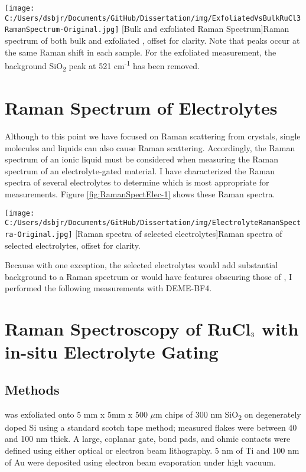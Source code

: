 \begin{centering}
\texttt{[image: C:/Users/dsbjr/Documents/GitHub/Dissertation/img/ExfoliatedVsBulkRuCl3RamanSpectrum-Original.jpg]}
  \captionsetup{width=0.75\textwidth}
  [Bulk and exfoliated \rucl Raman Spectrum]{Raman spectrum of both bulk and exfoliated \ruclnospace , offset for clarity. Note that peaks occur at the same Raman shift in each sample. For the exfoliated measurement, the background SiO\textsubscript{2} peak at 521 cm\textsuperscript{-1} has been removed.}
  \label{fig:RamanSpectRuCl3-4}
\end{centering}

\section{Raman Spectrum of Electrolytes}
Although to this point we have focused on Raman scattering from crystals, single molecules and liquids can also cause Raman scattering. Accordingly, the Raman spectrum of an ionic liquid must be considered when measuring the Raman spectrum of an electrolyte-gated material. I have characterized the Raman spectra of several electrolytes to determine which is most appropriate for measurements. Figure \ref{fig:RamanSpectElec-1} shows these Raman spectra.

\begin{centering}
\texttt{[image: C:/Users/dsbjr/Documents/GitHub/Dissertation/img/ElectrolyteRamanSpectra-Original.jpg]}
  \captionsetup{width=0.75\textwidth}
  [Raman spectra of selected electrolytes]{Raman spectra of selected electrolytes, offset for clarity.}
  \label{fig:RamanSpectElec-1}
\end{centering}

Because with one exception, the selected electrolytes would add substantial background to a Raman spectrum or would have features obscuring those of \rucl, I performed the following measurements with DEME-BF4.

\section{Raman Spectroscopy of \texorpdfstring{RuCl$\textsubscript{3}$}{RuCl3} with in-situ Electrolyte Gating}

\subsection{Methods}
\rucl was exfoliated onto 5 mm x 5mm x 500 $\mu$m chips of 300 nm SiO\textsubscript{2} on degenerately doped Si using a standard scotch tape method; measured \rucl flakes were between 40 and 100 nm thick. A large, coplanar gate, bond pads, and ohmic contacts were defined using either optical or electron beam lithography. 5 nm of Ti and 100 nm of Au were deposited using electron beam evaporation under high vacuum.

